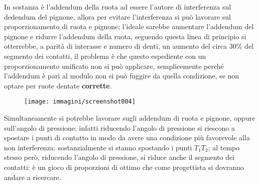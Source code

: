 \documentclass[a4paper, 15pt]{article}
\begin{document}
\begin{adjustwidth}{2in}{}
		In sostanza è l'addendum della ruota ad essere l'autore di interferenza sul dedendum del pignone, allora per evitare l'interferenza si può lavorare sul proporzionamento di ruota e pignone; l'ideale sarebbe aumentare l'addendum del pignone e ridurre l'addendum della ruota, seguendo questa linea di principio si otterrebbe, a parità di interasse  e numero di denti, un aumento del circa 30\%  del segmento dei contatti, il problema è che questo espediente con un proporzionamento unificato non si può applicare, semplicemente perché l'addendum è pari al modulo non si può fuggire da quella condizione, se non optare per ruote dentate \textbf{corrette}. 
		\begin{figure}[H]
			\centering
			\texttt{[image: immagini/screenshot004]}
			\label{fig:screenshot004}
		\end{figure}		
		Simultaneamente si potrebbe lavorare sugli addendum di ruota e pignone, oppure sull'angolo di pressione; infatti riducendo l'angolo di pressione si riescono a spostare i punti di contatto in modo da avere una condizione più favorevole alla non interferenza: sostanzialmente si stanno spostando i punti $T_1T_2$; al tempo stesso però, riducendo l'angolo di pressione, si riduce anche il segmento dei contatti: è un gioco di proporzioni di ottimo che come progettista si dovranno andare a ricercare.
\end{adjustwidth}
\newpage
\end{document}
